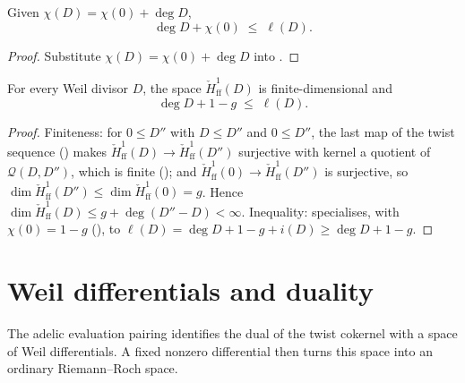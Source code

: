 \begin{lemma}
  \label{lem:adelic_riemann_inequality_conditional}
  \leanok
  Given \(\chi(D) = \chi(0) + \deg D\),
  \[
    \deg D + \chi(0) \;\le\; \ell(D).
  \]
\end{lemma}
\begin{proof}
  \leanok
  Substitute \(\chi(D) = \chi(0) + \deg D\) into
  .
\end{proof}

\begin{corollary}
  \label{thm:adelic_riemann_inequality}
  For every Weil divisor \(D\), the space
  \(\check{H}^1_{\mathrm{ff}}(D)\) is
  finite-dimensional and
  \[
    \deg D + 1 - g \;\le\; \ell(D) .
  \]
\end{corollary}
\begin{proof}
  Finiteness: for \(0 \le D''\) with \(D \le D''\) and \(0 \le D''\), the
  last map of the twist sequence
  () makes
  \(\check{H}^1_{\mathrm{ff}}(D) \to
  \check{H}^1_{\mathrm{ff}}(D'')\) surjective with kernel a
  quotient of \(\mathcal{Q}(D, D'')\), which is finite
  (); and
  \(\check{H}^1_{\mathrm{ff}}(0) \to
  \check{H}^1_{\mathrm{ff}}(D'')\) is surjective, so
  \(\dim \check{H}^1_{\mathrm{ff}}(D'')
    \le \dim \check{H}^1_{\mathrm{ff}}(0) = g\). Hence
  \(\dim \check{H}^1_{\mathrm{ff}}(D)
    \le g + \deg(D'' - D) < \infty\). Inequality:
   specialises, with
  \(\chi(0) = 1-g\)
  (), to
  \(\ell(D) = \deg D + 1 - g + i(D) \ge \deg D + 1 - g\).
\end{proof}

\section{Weil differentials and duality}
\label{sec:RiemannRoch_Adelic_duality}

The adelic evaluation pairing identifies the dual of the twist cokernel
with a space of Weil differentials.  A fixed nonzero differential then
turns this space into an ordinary Riemann--Roch space.

